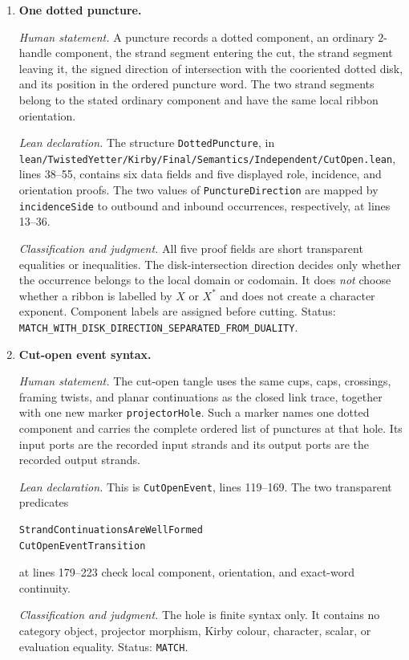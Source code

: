 \begin{enumerate}[label=\textbf{C\arabic*.},leftmargin=*]

\item \textbf{One dotted puncture.}

\emph{Human statement.}
A puncture records a dotted component, an ordinary $2$-handle component, the
strand segment entering the cut, the strand segment leaving it, the signed
direction of intersection with the cooriented dotted disk, and its position
in the ordered puncture word.  The two strand segments belong to the stated
ordinary component and have the same local ribbon orientation.

\emph{Lean declaration.}
The structure \texttt{DottedPuncture}, in
\nolinkurl{lean/TwistedYetter/Kirby/Final/Semantics/Independent/CutOpen.lean},
lines 38--55, contains six data fields and five displayed role, incidence, and
orientation proofs.  The two values of \texttt{PunctureDirection} are mapped
by \texttt{incidenceSide} to outbound and inbound occurrences, respectively,
at lines 13--36.

\emph{Classification and judgment.}
All five proof fields are short transparent equalities or inequalities.  The
disk-intersection direction decides only whether the occurrence belongs to
the local domain or codomain.  It does \emph{not} choose whether a ribbon is
labelled by $X$ or $X^*$ and does not create a character exponent.  Component
labels are assigned before cutting.  Status:
\nolinkurl{MATCH_WITH_DISK_DIRECTION_SEPARATED_FROM_DUALITY}.

\item \textbf{Cut-open event syntax.}

\emph{Human statement.}
The cut-open tangle uses the same cups, caps, crossings, framing twists, and
planar continuations as the closed link trace, together with one new marker
\texttt{projectorHole}.  Such a marker names one dotted component and carries
the complete ordered list of punctures at that hole.  Its input ports are the
recorded input strands and its output ports are the recorded output strands.

\emph{Lean declaration.}
This is \texttt{CutOpenEvent}, lines 119--169.  The two transparent predicates
\begin{verbatim}
StrandContinuationsAreWellFormed
CutOpenEventTransition
\end{verbatim}
at lines 179--223 check local component, orientation, and exact-word
continuity.

\emph{Classification and judgment.}
The hole is finite syntax only.  It contains no category object, projector
morphism, Kirby colour, character, scalar, or evaluation equality.  Status:
\texttt{MATCH}.


\end{enumerate}
